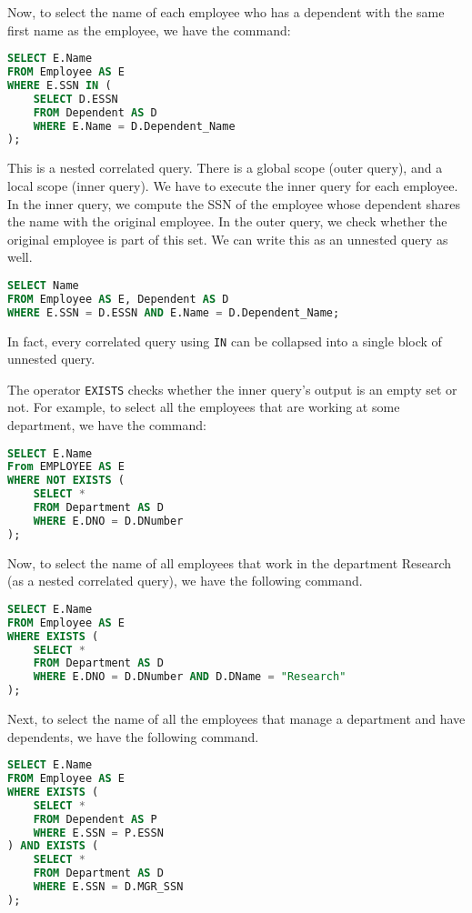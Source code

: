 \documentclass[a4paper, openany]{memoir}
\begin{document}
Now, to select the name of each employee who has a dependent with the same first name as the employee, we have the command:
\begin{lstlisting}[language=SQL]
SELECT E.Name
FROM Employee AS E
WHERE E.SSN IN (
    SELECT D.ESSN
    FROM Dependent AS D
    WHERE E.Name = D.Dependent_Name
);
\end{lstlisting}
This is a nested correlated query. There is a global scope (outer query), and a local scope (inner query). We have to execute the inner query for each employee. In the inner query, we compute the SSN of the employee whose dependent shares the name with the original employee. In the outer query, we check whether the original employee is part of this set. We can write this as an unnested query as well.
\begin{lstlisting}[language=SQL]
SELECT Name
FROM Employee AS E, Dependent AS D
WHERE E.SSN = D.ESSN AND E.Name = D.Dependent_Name;
\end{lstlisting}
In fact, every correlated query using \texttt{IN} can be collapsed into a single block of unnested query.

The operator \texttt{EXISTS} checks whether the inner query's output is an empty set or not. For example, to select all the employees that are working at some department, we have the  command:
\begin{lstlisting}[language=SQL]
SELECT E.Name
From EMPLOYEE AS E
WHERE NOT EXISTS (
    SELECT *
    FROM Department AS D
    WHERE E.DNO = D.DNumber
);
\end{lstlisting}
Now, to select the name of all employees that work in the department Research (as a nested correlated query), we have the following command.
\begin{lstlisting}[language=SQL]
SELECT E.Name
FROM Employee AS E
WHERE EXISTS (
    SELECT *
    FROM Department AS D
    WHERE E.DNO = D.DNumber AND D.DName = "Research"
);
\end{lstlisting}
Next, to select the name of all the employees that manage a department and have dependents, we have the following command.
\begin{lstlisting}[language=SQL]
SELECT E.Name
FROM Employee AS E
WHERE EXISTS (
    SELECT *
    FROM Dependent AS P
    WHERE E.SSN = P.ESSN
) AND EXISTS (
    SELECT *
    FROM Department AS D
    WHERE E.SSN = D.MGR_SSN
);
\end{lstlisting}
\end{document}
